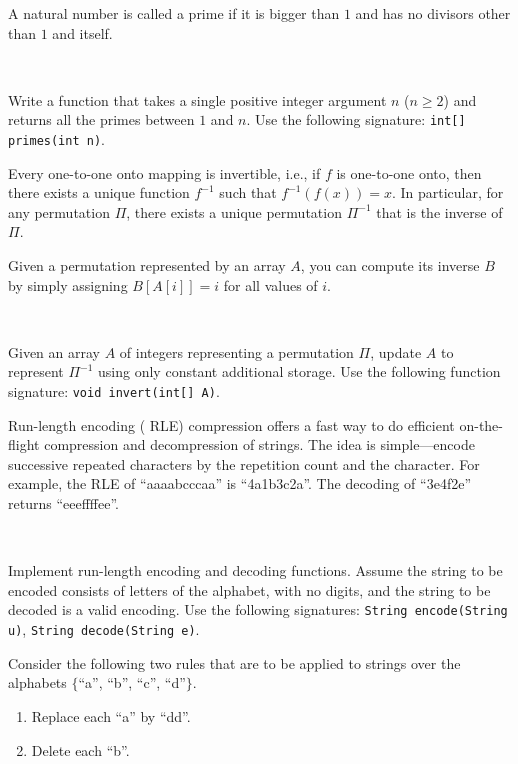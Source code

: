 \documentclass{jhwhw}
\newcommand{\myindex}[1]{%
}
\newcommand{\task}{%
\mbox{ }\\ %
\noindent{\bf Task:}
}
\begin{document}

A natural number is called a \myindex{prime|textbf}prime if it is bigger than $1$ and
has no \myindex{divisor}divisors other than $1$ and itself.

\task
Write a function that takes a single positive integer argument $n$ ($n \geq 2$) and returns
all the \myindex{prime}primes between $1$ and $n$. Use the following signature:
\texttt{int[] primes(int n)}.

Every one-to-one onto mapping is invertible, i.e., if $f$ is one-to-one onto, then there exists
a unique function $f^{-1}$ such that $f^{-1} (f(x)) = x$.
In particular, for any \myindex{permutation}permutation $\Pi$, there exists a 
unique \myindex{permutation}permutation $\Pi^{-1}$ that is the inverse of $\Pi$.

Given a \myindex{permutation}permutation represented by an \myindex{array}array $A$, you can
compute its inverse $B$ by simply assigning $B[A[i]] = i$ for all values of $i$.

\task
Given an \myindex{array}array $A$ of integers representing a \myindex{permutation}permutation $\Pi$, update
$A$ to represent $\Pi^{-1}$ using only constant additional storage. Use the following
function signature: \texttt{void invert(int[] A)}.

\label{RLE}
\myindex{run-length encoding|see{RLE}}Run-length encoding (\myindex{RLE|textbf}RLE) compression offers a fast way to do
efficient on-the-flight compression and decompression of \myindex{string}strings.
The idea is simple---encode successive repeated characters
by the repetition count and the character. For example, the \myindex{RLE}RLE of ``aaaabcccaa'' is
``4a1b3c2a''. The decoding of ``3e4f2e'' returns ``eeeffffee''.

\task
Implement run-length encoding and decoding functions. Assume the
\myindex{string}string to be encoded consists of letters of the alphabet, with
no digits, and the \myindex{string}string to be decoded is a valid encoding.
Use the following signatures: \texttt{String encode(String u)}, \texttt{String decode(String e)}.

\label{replace-remove}
Consider the following two rules that are
to be applied to \myindex{string}strings over the alphabets $\{$``a'', ``b'', ``c'', ``d''$\}$.
\begin{enumerate}
\item Replace each ``a'' by ``dd''.
\item Delete each ``b''.
\end{enumerate}
\end{document}
